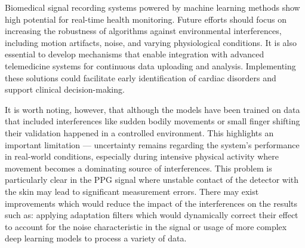 \documentclass{citask}
\begin{document}
Biomedical signal recording systems powered by machine learning methods show high potential for real-time health monitoring. Future efforts should focus on increasing the robustness of algorithms against environmental interferences, including motion artifacts, noise, and varying physiological conditions. It is also essential to develop mechanisms that enable integration with advanced telemedicine systems for continuous data uploading and analysis. Implementing these solutions could facilitate early identification of cardiac disorders and support clinical decision-making.

It is worth noting, however, that although the models have been trained on data that included interferences like sudden bodily movements or small finger shifting their validation happened in a controlled environment. This highlights an important limitation — uncertainty remains regarding the system’s performance in real-world conditions, especially during intensive physical activity where movement becomes a dominating source of interferences. This problem is particularly clear in the PPG signal where unstable contact of the detector with the skin may lead to significant measurement errors. There may exist improvements which would reduce the impact of the interferences on the results such as: applying adaptation filters which would dynamically correct their effect to account for the noise characteristic in the signal or usage of more complex deep learning models to process a variety of data.
\end{document}
